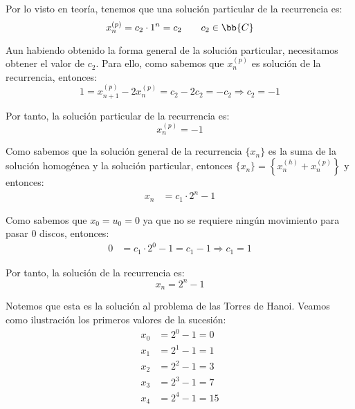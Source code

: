 \begin{ejercicio}
    Por lo visto en teoría, tenemos que una solución particular de la recurrencia es:
    \begin{equation*}
        x_n^{(p)} = c_2\cdot 1^n = c_2   \qquad c_2\in \bb{C}
    \end{equation*}

    Aun habiendo obtenido la forma general de la solución particular, necesitamos obtener
    el valor de $c_2$. Para ello, como sabemos que $x_n^{(p)}$ es solución de la recurrencia, entonces:
    \begin{equation*}
        1 = x_{n+1}^{(p)} - 2x_n^{(p)} = c_2 - 2c_2 = -c_2  \Longrightarrow c_2 = -1
    \end{equation*}

    Por tanto, la solución particular de la recurrencia es:
    \begin{equation*}
        x_n^{(p)} = -1
    \end{equation*}

    Como sabemos que la solución general de la recurrencia $\{x_n\}$ es la suma de la solución homogénea y la solución particular, entonces
    $\{x_n\} = \left\{x_n^{(h)} + x_n^{(p)}\right\}$ y entonces:
    \begin{align*}
        x_n &= c_1\cdot 2^n - 1
    \end{align*}

    Como sabemos que $x_0 = u_0 = 0$ ya que no se requiere ningún movimiento para pasar 0 discos, entonces:
    \begin{align*}
        0 &= c_1\cdot 2^0 - 1 = c_1 - 1 \Longrightarrow c_1 = 1
    \end{align*}

    Por tanto, la solución de la recurrencia es:
    \begin{equation*}
        x_n = 2^n - 1
    \end{equation*}

    Notemos que esta es la solución al problema de las Torres de Hanoi. Veamos como ilustración los primeros valores de la sucesión:
    \begin{align*}
        x_0 &= 2^0 - 1 = 0 \\
        x_1 &= 2^1 - 1 = 1 \\
        x_2 &= 2^2 - 1 = 3 \\
        x_3 &= 2^3 - 1 = 7 \\
        x_4 &= 2^4 - 1 = 15
    \end{align*}
\end{ejercicio}

